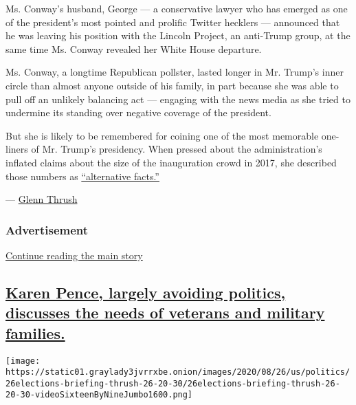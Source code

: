 Ms. Conway's husband, George --- a conservative lawyer who has emerged
as one of the president's most pointed and prolific Twitter hecklers ---
announced that he was leaving his position with the Lincoln Project, an
anti-Trump group, at the same time Ms. Conway revealed her White House
departure.

Ms. Conway, a longtime Republican pollster, lasted longer in Mr. Trump's
inner circle than almost anyone outside of his family, in part because
she was able to pull off an unlikely balancing act --- engaging with the
news media as she tried to undermine its standing over negative coverage
of the president.

But she is likely to be remembered for coining one of the most memorable
one-liners of Mr. Trump's presidency. When pressed about the
administration's inflated claims about the size of the inauguration
crowd in 2017, she described those numbers as
\href{https://www.washingtonpost.com/news/the-fix/wp/2017/01/22/kellyanne-conway-says-donald-trumps-team-has-alternate-facts-which-pretty-much-says-it-all/}{``alternative
facts.''}

--- \href{https://www.nytimes3xbfgragh.onion/by/glenn-thrush}{Glenn
Thrush}

\hypertarget{advertisement-4}{%
\subsubsection{Advertisement}\label{advertisement-4}}

\protect\hyperlink{after-dfp-ad-mid5}{Continue reading the main story}

\hypertarget{karen-pence-largely-avoiding-politics-discusses-the-needs-of-veterans-and-military-families}{%
\subsection{\texorpdfstring{\protect\hyperlink{karen-pence-largely-avoiding-politics-discusses-the-needs-of-veterans-and-military-families}{Karen
Pence, largely avoiding politics, discusses the needs of veterans and
military
families.}}{Karen Pence, largely avoiding politics, discusses the needs of veterans and military families.}}\label{karen-pence-largely-avoiding-politics-discusses-the-needs-of-veterans-and-military-families}}

\texttt{[image: https://static01.graylady3jvrrxbe.onion/images/2020/08/26/us/politics/26elections-briefing-thrush-26-20-30/26elections-briefing-thrush-26-20-30-videoSixteenByNineJumbo1600.png]}

